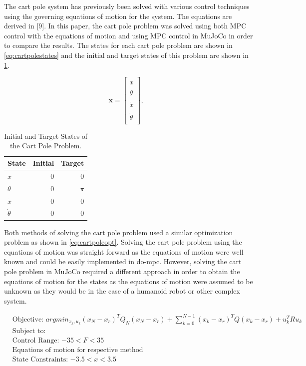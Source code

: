\documentclass{./springer/svjour3}
\newcommand{\mb}[1]{\mathbf{#1}}
\begin{document}
The cart pole system has previously been solved with various control techniques using the governing equations of motion for the system. The equations are derived in [9]. In this
paper, the cart pole problem was solved using both MPC control with the equations of motion and using MPC control in MuJoCo in order to compare the results.
The states for each cart pole problem are shown in \ref{eq:cartpolestates} and the initial and target states of this problem are shown in
\ref{tab:init_tar_carteqn}.

\begin{equation}
  \mb{x} = 
  \begin{bmatrix}
  \\x\\
  \\\theta\\
  \\\dot{x}\\
  \\\dot{\theta}\\
  \end{bmatrix}, \quad
  \label{eq:cartpolestates}
\end{equation}

\begin{table}[h]
  \centering
  \caption{Initial and Target States of the Cart Pole Problem.}
  \begin{tabular}{lrr}
  \toprule
  State & Initial & Target\\
  \midrule
  $x$ & 0  & 0\\
  $\theta$ & 0 & $\pi$ \\
  $\dot{x}$ & 0 & 0\\
  $\dot{\theta}$ & 0 & 0\\
  \end{tabular}
  \label{tab:init_tar_carteqn}
\end{table}

Both methods of solving the cart pole problem used a similar optimization problem as shown in \ref{eq:cartpoleopt}. 
Solving the cart pole problem using the equations of motion was straight forward as the equations of motion were well known and could be easily implemented in do-mpc.
However, solving the cart pole problem in MuJoCo required a different approach in order to obtain the equations of motion for the states as the equations of motion 
were assumed to be unknown as they would be in the case of a humanoid robot or other complex system.

\begin{equation}
  \begin{aligned}
  &\text{Objective: $arg min_{x_k,u_k} (x_N - x_r)^TQ_N(x_N - x_r) + \sum_{k = 0}^{N-1} (x_k - x_r)^TQ(x_k - x_r) + u_k^TRu_k $}\\
  &\text{Subject to:}\\
  &\text{Control Range: $-35 < F < 35$}\\
  &\text{Equations of motion for respective method}\\
  &\text{State Constraints: $-3.5 < x < 3.5$}
  \end{aligned}
  \label{eq:cartpoleopt}
\end{equation}
\end{document}
